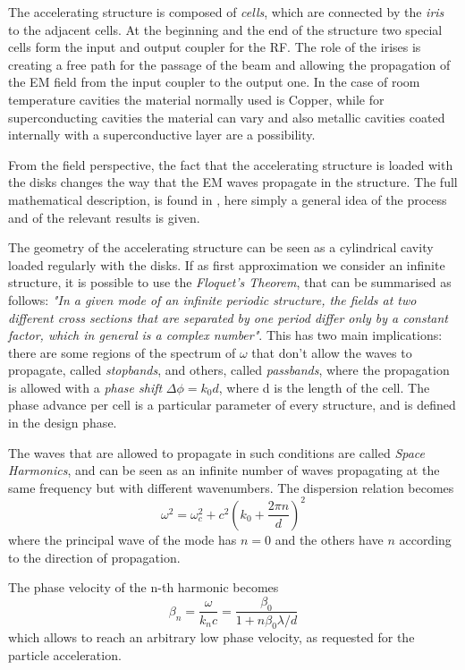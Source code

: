 The accelerating structure is composed of \textit{cells}, which are connected by the \textit{iris} to the adjacent cells. At the beginning and the end of the structure two special cells form the input and output coupler for the RF. The role of the irises is creating a free path for the passage of the beam and allowing the propagation of the EM field from the input coupler to the output one. In the case of room temperature cavities the material normally used is Copper, while for superconducting cavities the material can vary and also metallic cavities coated internally with a superconductive layer are a possibility.

From the field perspective, the fact that the accelerating structure is loaded with the disks changes the way that the EM waves propagate in the structure. The full mathematical description, is found in \cite{ Jackson:ClassEM,Weiss:261732}, here simply a general idea of the process and of the relevant results is given.

The geometry of the accelerating structure can be seen as a cylindrical cavity loaded regularly with the disks. If as first approximation we consider an infinite structure, it is possible to use the \textit{Floquet's Theorem}, that can be summarised as follows: \textit{"In a given mode of an infinite periodic structure, the fields at two different cross sections that are separated by one period differ only by a constant factor, which in general is a complex number"}. This has two main implications: there are some regions of the spectrum of $\omega$ that don't allow the waves to propagate, called \textit{stopbands}, and others, called \textit{passbands}, where the propagation is allowed with a \textit{phase shift} $\Delta \phi = k_0 d$, where d is the length of the cell. The phase advance per cell is a particular parameter of every structure, and is defined in the design phase.

The waves that are allowed to propagate in such conditions are called \textit{Space Harmonics}, and can be seen as an infinite number of waves propagating at the same frequency but with different wavenumbers. The dispersion relation becomes
\begin{equation}
\omega ^2 = \omega^2_c + c^2 \left( k_0 + \frac{2\pi n}{d} \right)^2
\end{equation}
where the principal wave of the mode has $n=0$ and the others have $n$ according to the direction of propagation.

The phase velocity of the n-th harmonic becomes
\begin{equation}
\beta_n = \frac{\omega}{k_n c} = \frac{\beta_0}{1+n\beta_0 \lambda/d}
\end{equation}
which allows to reach an arbitrary low phase velocity, as requested for the particle acceleration.

